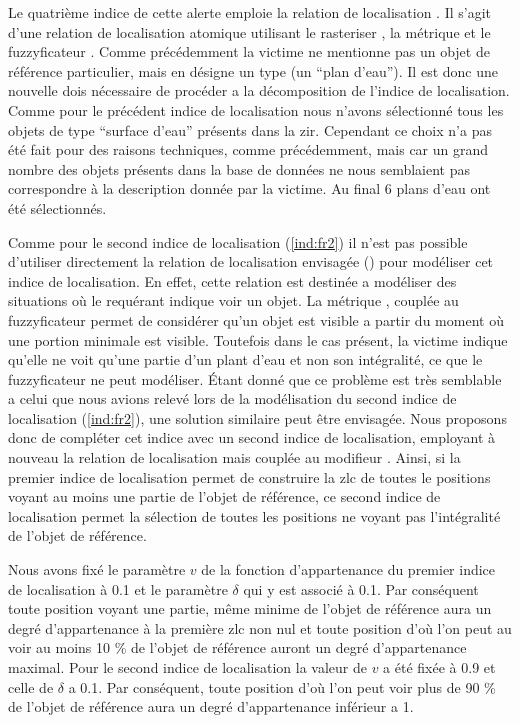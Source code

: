 Le quatrième indice de cette alerte emploie la relation de
localisation . Il s'agit d'une relation
de localisation atomique utilisant le rasteriser
, la métrique  et le
fuzzyficateur . Comme précédemment la victime ne
mentionne pas un objet de référence particulier, mais en désigne un
type (\ie un \enquote{plan d'eau}). Il est donc une nouvelle dois
nécessaire de procéder a la décomposition de l'indice de
localisation. Comme pour le précédent indice de localisation nous
n'avons sélectionné tous les objets de type \enquote{surface d'eau}
présents dans la \ac{zir}. Cependant ce choix n'a pas été fait pour
des raisons techniques, comme précédemment, mais car un grand nombre
des objets présents dans la base de données ne nous semblaient pas
correspondre à la description donnée par la victime. Au final 6 plans
d'eau ont été sélectionnés.

Comme pour le second indice de localisation (\ref{ind:fr2}) il n'est
pas possible d'utiliser directement la relation de localisation
envisagée () pour modéliser cet indice de
localisation. En effet, cette relation est destinée a modéliser des
situations où le requérant indique voir un objet. La métrique
, couplée au fuzzyficateur
 permet de considérer qu'un objet est visible a
partir du moment où une portion minimale est visible. Toutefois dans
le cas présent, la victime indique qu'elle ne voit qu'une partie d'un
plant d'eau et non son intégralité, ce que le fuzzyficateur
 ne peut modéliser. Étant donné que ce problème
est très semblable a celui que nous avions relevé lors de la
modélisation du second indice de localisation (\ref{ind:fr2}), une
solution similaire peut être envisagée. Nous proposons donc de
compléter cet indice avec un second indice de localisation, employant
à nouveau la relation de localisation 
mais couplée au modifieur . Ainsi, si la premier
indice de localisation permet de construire la \ac{zlc} de toutes le
positions voyant au moins une partie de l'objet de référence, ce
second indice de localisation permet la sélection de toutes les
positions ne voyant pas l'intégralité de l'objet de référence.

Nous avons fixé le paramètre \(v\) de la fonction d'appartenance du
premier indice de localisation à \num{0,1} et le paramètre \(\delta\)
qui y est associé à \num{0,1}. Par conséquent toute position voyant
une partie, même minime de l'objet de référence aura un degré
d'appartenance à la première \ac{zlc} non nul et toute position d'où
l'on peut au voir au moins 10 \% de l'objet de référence auront un
degré d'appartenance maximal. Pour le second indice de localisation la
valeur de \(v\) a été fixée à \num{0,9} et celle de \(\delta\) a
\num{0,1}. Par conséquent, toute position d'où l'on peut voir plus de
90 \% de l'objet de référence aura un degré d'appartenance inférieur a
1.

